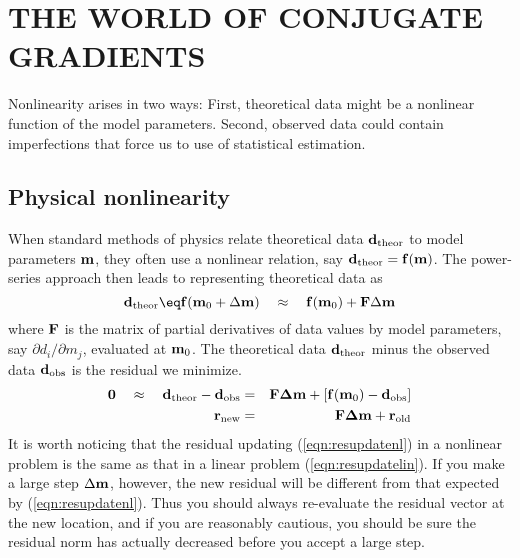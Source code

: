 \begin{comment}
\par
Here is a real-world problem you could think about:
You have earthquake seismograms recorded at $i=1,2,...,N$ locations.
You would like to shift them into alignment.
Assume a cartesian geometry.
You have measured all possible time lags $\tau_{i,j}$
between station $i$ and station $j$.
What operator would you be giving to the solver?

\end{comment}

\section{THE WORLD OF CONJUGATE GRADIENTS}

Nonlinearity arises in two ways:
First, theoretical data might be a nonlinear function of the model parameters.
Second, observed data could contain imperfections that force us to use
 of statistical estimation.

\subsection{Physical nonlinearity}
When standard methods of physics
relate theoretical data $\bold d_{\rm theor}$ to model parameters $\bold m$,
they often use a nonlinear relation,
say $\bold d_{\rm theor} =\bold f(\bold m)$.
The power-series approach then leads to
representing theoretical data as
\begin{equation}
\bold d_{\rm theor} \eq
  \bold f(\bold m_0 + \Delta \bold m)
  \quad\approx\quad
  \bold f\bold (\bold m_0) + \bold F\Delta \bold m
\end{equation}
where $\bold F$ is the matrix of partial derivatives
of data values by model parameters,
say $\partial d_i/\partial m_j$,
evaluated at $\bold m_0$.
The theoretical data  $\bold d_{\rm theor}$ minus
the observed data $\bold d_{\rm obs}$ is the residual we minimize.
\begin{eqnarray}
\bold 0 \quad\approx\quad
 \bold d_{\rm theor} - \bold d_{\rm obs}
 &=& \bold F\bold \Delta\bold  m +[\bold f(\bold m_0) - \bold d_{\rm obs}] \\
\bold r_{\rm new}
 &=& \bold F\bold \Delta\bold  m + \bold r_{\rm old}
\label{eqn:resupdatenl}
\end{eqnarray}
It is worth noticing that the residual updating
(\ref{eqn:resupdatenl})
in a nonlinear problem is the same
as that in a linear problem (\ref{eqn:resupdatelin}).
If you make a large step $\Delta \bold m$, however,
the new residual
will be different from that expected by
(\ref{eqn:resupdatenl}).
Thus you should always re-evaluate the residual vector at the new location,
and if you are reasonably cautious,
you should be sure the residual norm has actually decreased
before you accept a large step.

